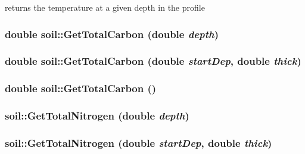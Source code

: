 returns the temperature at a given depth in the profile \hypertarget{classsoil_abc702757f606501ec347fe5ee048da99}{
\subsubsection[{GetTotalCarbon}]{\setlength{\rightskip}{0pt plus 5cm}double soil::GetTotalCarbon (double {\em depth})}}
\label{classsoil_abc702757f606501ec347fe5ee048da99}
\hypertarget{classsoil_a8f72cbbd1c353fe6b889dfdb16c341e4}{
\subsubsection[{GetTotalCarbon}]{\setlength{\rightskip}{0pt plus 5cm}double soil::GetTotalCarbon (double {\em startDep}, \/  double {\em thick})}}
\label{classsoil_a8f72cbbd1c353fe6b889dfdb16c341e4}
\hypertarget{classsoil_a317255eb34e9a0abe806adb08b236b9e}{
\subsubsection[{GetTotalCarbon}]{\setlength{\rightskip}{0pt plus 5cm}double soil::GetTotalCarbon ()}}
\label{classsoil_a317255eb34e9a0abe806adb08b236b9e}
\hypertarget{classsoil_a1ffeaf9576f8a6b9f09da84e921647d1}{
\subsubsection[{GetTotalNitrogen}]{ soil::GetTotalNitrogen (double {\em depth})}}
\label{classsoil_a1ffeaf9576f8a6b9f09da84e921647d1}
\hypertarget{classsoil_ae8d39d1c2f75f1aee237f657f7ac736d}{
\subsubsection[{GetTotalNitrogen}]{ soil::GetTotalNitrogen (double {\em startDep}, \/  double {\em thick})}}
